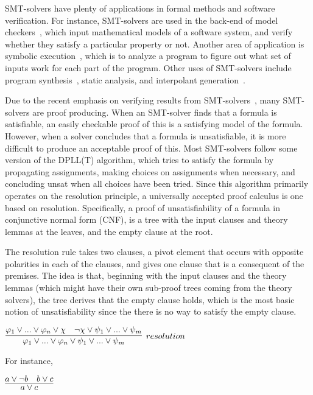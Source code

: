 \documentclass{article}
\begin{document}
	SMT-solvers have plenty of applications in formal methods 
	and software verification. For instance, SMT-solvers are used 
	in the back-end of model checkers~\cite{DBLP:books/daglib/0020348}, 
	which input mathematical 
	models of a software system, and verify whether they 
	satisfy a particular property or not. Another area of 
	application is symbolic
	execution~\cite{DBLP:journals/csur/BaldoniCDDF18}, 
	which is to analyze a 
	program to figure out what set of inputs work for each 
	part of the program. Other uses of SMT-solvers include 
	program synthesis~\cite{synth}, static analysis, 
	and interpolant generation~\cite{DBLP:journals/corr/abs-1111-5652}.
	
	Due to the recent emphasis on verifying results from SMT-solvers~\cite{10.1145/1670412.1670413,
	mansur2020detecting, 10.1007/978-3-642-38916-0_3},
	many SMT-solvers are proof producing. When an SMT-solver finds 
	that a formula is satisfiable, an easily checkable proof of this is 
	a satisfying model of the formula. However, when a solver 
	concludes that a formula is unsatisfiable, it is more difficult 
	to produce an acceptable proof of this. Most SMT-solvers 
	follow some version of the DPLL(T) algorithm, which tries
	to satisfy the formula by propagating assignments, making 
	choices on assignments when necessary, and concluding unsat
	when all choices have been tried. Since this algorithm 
	primarily operates on the resolution principle, 
	a universally accepted proof calculus is one based 
	on resolution. Specifically, a proof of unsatisfiability 
	of a formula in conjunctive normal form (CNF), is a tree 
	with the input clauses and theory lemmas at the leaves, 
	and the empty clause at the root. 
	
	The resolution rule takes two clauses, a pivot element 
	that occurs with opposite polarities in each of the 
	clauses, and gives one clause that is a consequent 
	of the premises. The idea is that, beginning 
	with the input clauses and the theory lemmas (which might 
	have their own sub-proof trees coming from the theory solvers), 
	the tree derives that the empty clause holds, which is the 
	most basic notion of unsatisfiability since the there 
	is no way to satisfy the empty clause.
	
	\begin{center}
		$\infer[resolution]{\varphi_1 \lor ... \lor \varphi_n \lor 
			\psi_1 \lor ... \lor \psi_m}
		{\varphi_1 \lor ... \lor \varphi_n \lor \chi & \neg \chi 
			\lor \psi_1 \lor ... \lor \psi_m}$ 
	\end{center}
	For instance,
	\begin{center}
		$\infer{a \lor c}{a \lor \neg b & b \lor c}$
	\end{center}
	
\end{document}
